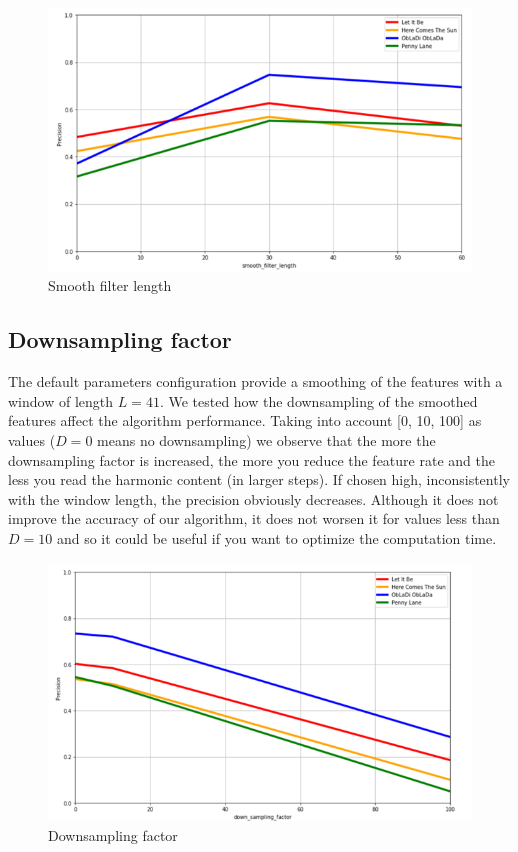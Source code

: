 \documentclass[
	12pt, %
]{fphw}
\begin{document}
{\begin{figure}[H]
 \centering
 \includegraphics[scale=1]{./images/5_smooth_precision.png}
 \caption{Smooth filter length}
\end{figure}

\subsection*{Downsampling factor}

The default parameters configuration provide a smoothing of the features with a window of length $L=41$. We tested how the downsampling of the smoothed features affect the algorithm performance. Taking into account [0, 10, 100] as values ($D=0$ means no downsampling) we observe that the more the downsampling factor is increased, the more you reduce the feature rate and the less you read the harmonic content (in larger steps). If chosen high, inconsistently with the window length, the precision obviously decreases. Although it does not improve the accuracy of our algorithm, it does not worsen it for values less than $D=10$ and so it could be useful if you want to optimize the computation time.

\begin{figure}[H]
 \centering
 \includegraphics[scale=1]{./images/5_down_sampling_precision.png}
 \caption{Downsampling factor}
\end{figure}

}
\end{document}
